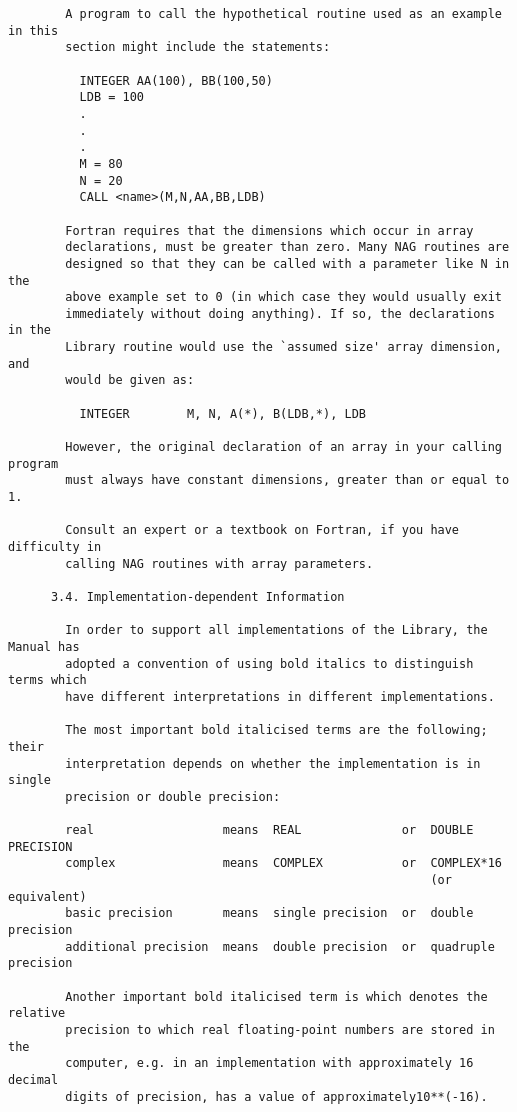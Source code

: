 \begin{small}
\begin{verbatim}
        A program to call the hypothetical routine used as an example in this
        section might include the statements:

          INTEGER AA(100), BB(100,50)
          LDB = 100
          .
          .
          .
          M = 80
          N = 20
          CALL <name>(M,N,AA,BB,LDB)

        Fortran requires that the dimensions which occur in array
        declarations, must be greater than zero. Many NAG routines are
        designed so that they can be called with a parameter like N in the
        above example set to 0 (in which case they would usually exit
        immediately without doing anything). If so, the declarations in the
        Library routine would use the `assumed size' array dimension, and
        would be given as:

          INTEGER        M, N, A(*), B(LDB,*), LDB

        However, the original declaration of an array in your calling program
        must always have constant dimensions, greater than or equal to 1.

        Consult an expert or a textbook on Fortran, if you have difficulty in
        calling NAG routines with array parameters.

      3.4. Implementation-dependent Information

        In order to support all implementations of the Library, the Manual has
        adopted a convention of using bold italics to distinguish terms which
        have different interpretations in different implementations.

        The most important bold italicised terms are the following; their
        interpretation depends on whether the implementation is in single
        precision or double precision:

        real                  means  REAL              or  DOUBLE PRECISION
        complex               means  COMPLEX           or  COMPLEX*16
                                                           (or equivalent)
        basic precision       means  single precision  or  double precision
        additional precision  means  double precision  or  quadruple precision

        Another important bold italicised term is which denotes the relative
        precision to which real floating-point numbers are stored in the
        computer, e.g. in an implementation with approximately 16 decimal
        digits of precision, has a value of approximately10**(-16).


\end{verbatim}
\end{small}

